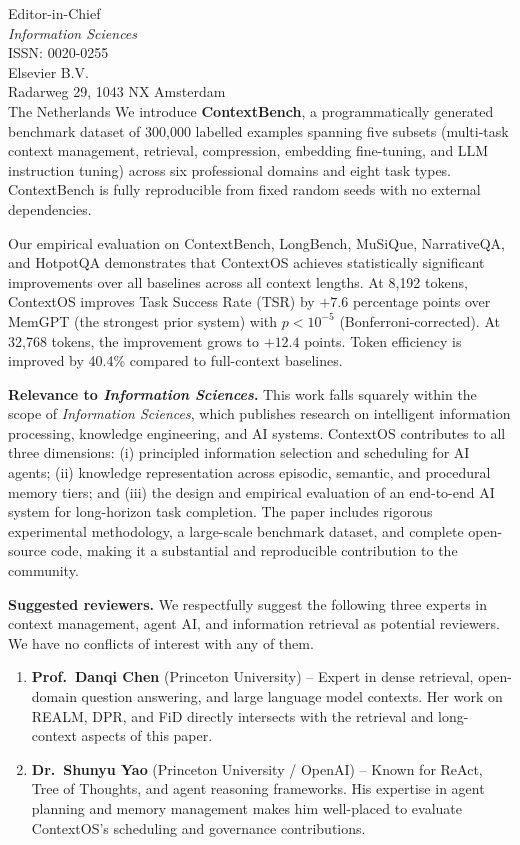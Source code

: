 \documentclass[12pt, a4paper]{letter}
\begin{document}
\begin{letter}{
  Editor-in-Chief \\
  \textit{Information Sciences} \\
  ISSN: 0020-0255 \\
  Elsevier B.V. \\
  Radarweg 29, 1043 NX Amsterdam \\
  The Netherlands
}
We introduce \textbf{ContextBench}, a programmatically generated benchmark
dataset of 300{,}000 labelled examples spanning five subsets (multi-task
context management, retrieval, compression, embedding fine-tuning, and LLM
instruction tuning) across six professional domains and eight task types.
ContextBench is fully reproducible from fixed random seeds with no external
dependencies.

Our empirical evaluation on ContextBench, LongBench, MuSiQue, NarrativeQA,
and HotpotQA demonstrates that ContextOS achieves statistically significant
improvements over all baselines across all context lengths.  At 8{,}192
tokens, ContextOS improves Task Success Rate (TSR) by $+7.6$ percentage
points over MemGPT (the strongest prior system) with $p < 10^{-5}$
(Bonferroni-corrected).  At 32{,}768 tokens, the improvement grows to
$+12.4$ points.  Token efficiency is improved by 40.4\% compared to
full-context baselines.

\textbf{Relevance to \textit{Information Sciences}.}  This work falls squarely
within the scope of \textit{Information Sciences}, which publishes research on
intelligent information processing, knowledge engineering, and AI systems.
ContextOS contributes to all three dimensions: (i) principled information
selection and scheduling for AI agents; (ii) knowledge representation across
episodic, semantic, and procedural memory tiers; and (iii) the design and
empirical evaluation of an end-to-end AI system for long-horizon task
completion.  The paper includes rigorous experimental methodology, a
large-scale benchmark dataset, and complete open-source code, making it a
substantial and reproducible contribution to the community.

\textbf{Suggested reviewers.}  We respectfully suggest the following three
experts in context management, agent AI, and information retrieval as
potential reviewers.  We have no conflicts of interest with any of them.

\begin{enumerate}
  \item \textbf{Prof.\ Danqi Chen} (Princeton University) -- Expert in dense
        retrieval, open-domain question answering, and large language model
        contexts.  Her work on REALM, DPR, and FiD directly intersects with
        the retrieval and long-context aspects of this paper.

  \item \textbf{Dr.\ Shunyu Yao} (Princeton University / OpenAI) -- Known for
        ReAct, Tree of Thoughts, and agent reasoning frameworks.  His expertise
        in agent planning and memory management makes him well-placed to
        evaluate ContextOS's scheduling and governance contributions.


\end{enumerate}
\end{letter}
\end{document}
